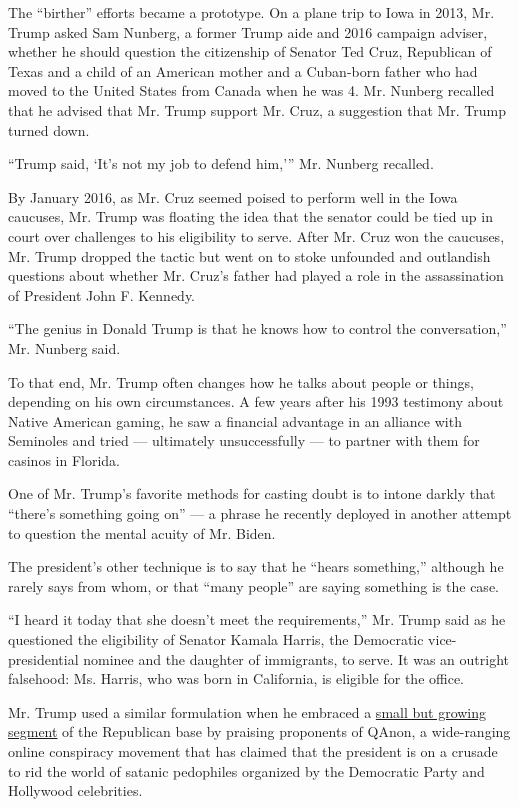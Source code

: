 The ``birther'' efforts became a prototype. On a plane trip to Iowa in
2013, Mr. Trump asked Sam Nunberg, a former Trump aide and 2016 campaign
adviser, whether he should question the citizenship of Senator Ted Cruz,
Republican of Texas and a child of an American mother and a Cuban-born
father who had moved to the United States from Canada when he was 4. Mr.
Nunberg recalled that he advised that Mr. Trump support Mr. Cruz, a
suggestion that Mr. Trump turned down.

``Trump said, `It's not my job to defend him,''' Mr. Nunberg recalled.

By January 2016, as Mr. Cruz seemed poised to perform well in the Iowa
caucuses, Mr. Trump was floating the idea that the senator could be tied
up in court over challenges to his eligibility to serve. After Mr. Cruz
won the caucuses, Mr. Trump dropped the tactic but went on to stoke
unfounded and outlandish questions about whether Mr. Cruz's father had
played a role in the assassination of President John F. Kennedy.

``The genius in Donald Trump is that he knows how to control the
conversation,'' Mr. Nunberg said.

To that end, Mr. Trump often changes how he talks about people or
things, depending on his own circumstances. A few years after his 1993
testimony about Native American gaming, he saw a financial advantage in
an alliance with Seminoles and tried --- ultimately unsuccessfully ---
to partner with them for casinos in Florida.

One of Mr. Trump's favorite methods for casting doubt is to intone
darkly that ``there's something going on'' --- a phrase he recently
deployed in another attempt to question the mental acuity of Mr. Biden.

The president's other technique is to say that he ``hears something,''
although he rarely says from whom, or that ``many people'' are saying
something is the case.

``I heard it today that she doesn't meet the requirements,'' Mr. Trump
said as he questioned the eligibility of Senator Kamala Harris, the
Democratic vice-presidential nominee and the daughter of immigrants, to
serve. It was an outright falsehood: Ms. Harris, who was born in
California, is eligible for the office.

Mr. Trump used a similar formulation when he embraced a
\href{https://www.nytimes3xbfgragh.onion/2020/08/20/us/politics/qanon-trump-republicans.html}{small
but growing segment} of the Republican base by praising proponents of
QAnon, a wide-ranging online conspiracy movement that has claimed that
the president is on a crusade to rid the world of satanic pedophiles
organized by the Democratic Party and Hollywood celebrities.

